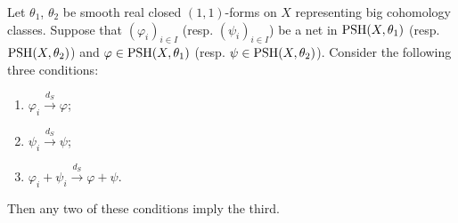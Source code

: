 \begin{theorem}\label{thm:dSadditivity}
    Let $\theta_1$, $\theta_2$ be smooth real closed $(1,1)$-forms on $X$ representing big cohomology classes. Suppose that $(\varphi_i)_{i\in I}$ (resp. $(\psi_i)_{i\in I}$) be a net in $\mathrm{PSH}(X,\theta_1)$ (resp. $\mathrm{PSH}(X,\theta_2)$) and $\varphi\in \mathrm{PSH}(X,\theta_1)$ (resp. $\psi\in \mathrm{PSH}(X,\theta_2)$).
    Consider the following three conditions:
    \begin{enumerate}
        \item\label{itm:thm:dSadditivity:1} $\varphi_i\xrightarrow{d_{S}}\varphi$;
        \item\label{itm:thm:dSadditivity:2} $\psi_i\xrightarrow{d_{S}}\psi$;
        \item\label{itm:thm:dSadditivity:3} $\varphi_i+\psi_i\xrightarrow{d_{S}}\varphi+\psi$.
    \end{enumerate}
    Then any two of these conditions imply the third.
\end{theorem}
